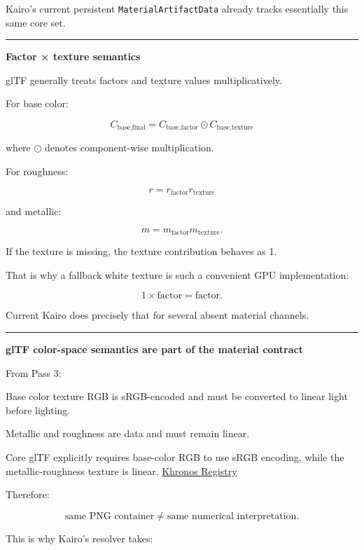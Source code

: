 Kairo's current persistent \texttt{MaterialArtifactData} already tracks essentially this same core set.

\begin{center}\rule{0.5\linewidth}{0.5pt}\end{center}

\textbf{Factor × texture semantics}

glTF generally treats factors and texture values multiplicatively.

For base color:

\[
\boxed{
C_{\text{base,final}}
=
C_{\text{base,factor}}
\odot
C_{\text{base,texture}}
}
\]

where \(\odot\) denotes component-wise multiplication.

For roughness:

\[
\boxed{
r=
r_{\text{factor}}
r_{\text{texture}}
}
\]

and metallic:

\[
\boxed{
m=
m_{\text{factor}}
m_{\text{texture}}.
}
\]

If the texture is missing, the texture contribution behaves as 1.

That is why a fallback white texture is such a convenient GPU implementation:

\[
1\times\text{factor}
=
\text{factor}.
\]

Current Kairo does precisely that for several absent material channels.

\begin{center}\rule{0.5\linewidth}{0.5pt}\end{center}

\textbf{glTF color-space semantics are part of the material contract}

From Pass 3:

Base color texture RGB is sRGB-encoded and must be converted to linear light before lighting.

Metallic and roughness are data and must remain linear.

Core glTF explicitly requires base-color RGB to use sRGB encoding, while the metallic-roughness texture is linear. \href{https://registry.khronos.org/glTF/specs/2.0/glTF-2.0.html?utm_source=chatgpt.com}{Khronos Registry}

Therefore:

\[
\boxed{
\text{same PNG container}
\neq
\text{same numerical interpretation}.
}
\]

This is why Kairo's resolver takes:

